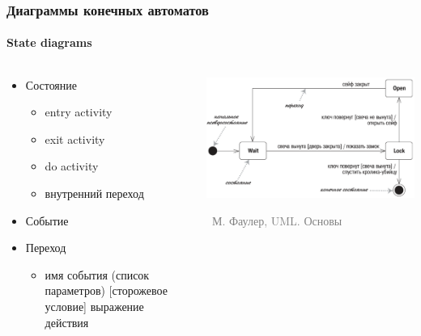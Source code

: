 \documentclass[xetex,mathserif,serif]{beamer}
\newcommand{\attribution}[1] {
\vspace{-5mm}\begin{flushright}\begin{scriptsize}\textcolor{gray}{\textcopyright\, #1}\end{scriptsize}\end{flushright}
}
\begin{document}
	\begin{frame}
		\frametitle{Диаграммы конечных автоматов}
		\framesubtitle{State diagrams}
		\begin{columns}
			\begin{column}{0.5\textwidth}
				\begin{itemize}
					\item Состояние
					\begin{itemize}
						\item entry activity
						\item exit activity
						\item do activity
						\item внутренний переход
					\end{itemize}
					\item Событие
					\item Переход
					\begin{itemize}
						\item имя события (список параметров) [сторожевое условие] выражение действия
					\end{itemize}
				\end{itemize}
			\end{column}
			\begin{column}{0.5\textwidth}
				\begin{center}
					\includegraphics[width=\textwidth]{stateTransitionSyntax.png}
					\attribution{М. Фаулер, UML. Основы}
				\end{center}
			\end{column}
		\end{columns}
	\end{frame}
\end{document}
